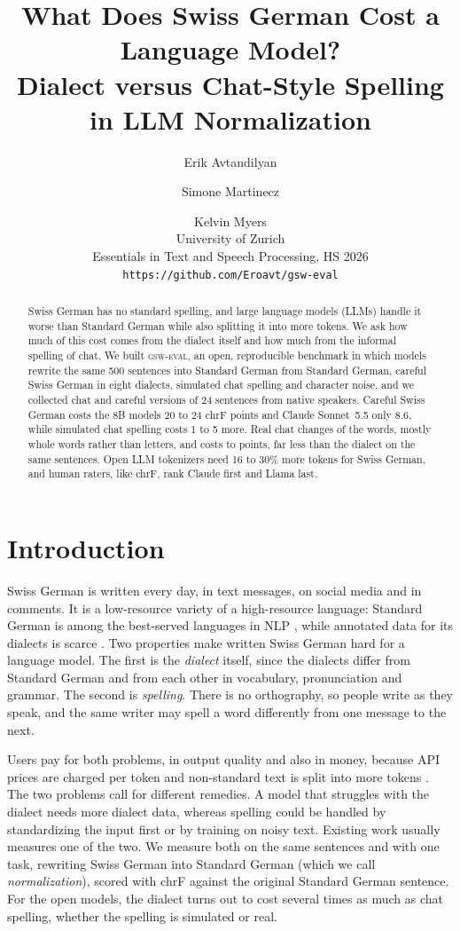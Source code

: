 \documentclass[11pt]{article}
\title{What Does Swiss German Cost a Language Model?\\
Dialect versus Chat-Style Spelling in LLM Normalization}
\author{Erik Avtandilyan \and Simone Martinecz \and Kelvin Myers \\
  University of Zurich \\
  Essentials in Text and Speech Processing, HS 2026 \\
  \texttt{https://github.com/Eroavt/gsw-eval}}
\begin{document}
\raggedbottom
\maketitle

\begin{abstract}
Swiss German has no standard spelling, and large language models (LLMs) handle it worse than
Standard German while also splitting it into more tokens. We ask how much of this cost comes from the
dialect itself and how much from the informal spelling of chat. We built \textsc{gsw-eval}, an open,
reproducible benchmark in which models rewrite the same 500 sentences into Standard German from
Standard German, careful Swiss German in eight dialects, simulated chat spelling and character
noise, and we collected chat and careful versions of 24 sentences from \FreshWriters{} native
speakers. Careful Swiss German costs the 8B models 20 to 24 chrF points and Claude Sonnet~5.5 only
8.6, while simulated chat spelling costs 1 to 5 more. Real chat changes \FreshChatChanged{} of the
words, mostly whole words rather than letters, and costs \FreshRealMin{} to \FreshRealMax{} points,
far less than the dialect on the same sentences. Open LLM tokenizers need 16 to 30\% more tokens for Swiss German,
and human raters, like chrF, rank Claude first and Llama last.
\end{abstract}

\section{Introduction}

Swiss German is written every day, in text messages, on social media and in comments. It is a
low-resource variety of a high-resource language: Standard German is among the best-served
languages in NLP \citep{joshi2020state}, while annotated data for its dialects is scarce
\citep{dogan2021swissdial}. Two properties make
written Swiss German hard for a language model. The first is the \emph{dialect} itself, since the
dialects differ from Standard German and from each other in vocabulary, pronunciation and grammar.
The second is \emph{spelling}. There is no orthography, so people write as they speak, and the same
writer may spell a word differently from one message to the next.

Users pay for both problems, in output quality and also in money, because API prices are charged per
token and non-standard text is split into more tokens \citep{petrov2023unfairness,ahia2023cost}. The
two problems call for different remedies. A model that struggles with the dialect needs more dialect
data, whereas spelling could be handled by standardizing the input first or by training on noisy
text. Existing work usually measures one of the two. We measure both on the same sentences and with
one task, rewriting Swiss German into Standard German (which we call \emph{normalization}), scored
with chrF against the original Standard German sentence. For the open models, the dialect turns out
to cost several times as much as chat spelling, whether the spelling is simulated or real.
\end{document}
